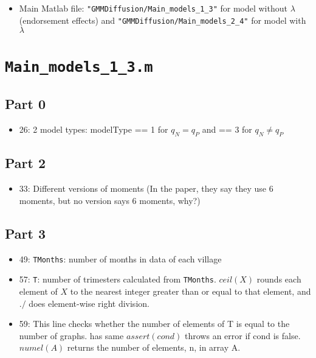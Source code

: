 \documentclass[10pt,letterpaper]{article}
\author{Mizuhiro Suzuki}
\title{}
\begin{document}
\maketitle

\tableofcontents

\section{}

\begin{itemize}
  \item Main Matlab file: \texttt{"GMMDiffusion/Main\_models\_1\_3"} for model without $\lambda$ (endorsement effects) and \texttt{"GMMDiffusion/Main\_models\_2\_4"} for model with $\lambda$
\end{itemize}

\section{\texttt{Main\_models\_1\_3.m}}\label{main_models_1_3}

\subsection*{Part 0}
\begin{itemize}
  \item 26: 2 model types: modelType == 1 for $q_N = q_P$ and == 3 for $q_N \ne q_P$
\end{itemize}

\subsection*{Part 2}
\begin{itemize}
  \item 33: Different versions of moments
    (In the paper, they say they use 6 moments, but no version says 6 moments, why?)
\end{itemize}

\subsection*{Part 3}
\begin{itemize}
  \item 49: \texttt{TMonths}: number of months in data of each village
  \item 57: \texttt{T}: number of trimesters calculated from \texttt{TMonths}. $ceil(X)$ rounds each element of $X$ to the nearest integer greater than or equal to that element, and $./$ does element-wise right division.
  \item 59: This line checks whether the number of elements of T is equal to the number of graphs. has same $assert(cond)$ throws an error if cond is false. $numel(A)$ returns the number of elements, n, in array A.
\end{itemize}
\end{document}
